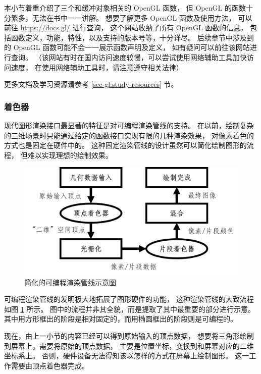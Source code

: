 \documentclass[fontset=windows]{ctexart}
\begin{document}
本小节着重介绍了三个和缓冲对象相关的 OpenGL 函数，
但 OpenGL 的函数十分繁多，无法在书中一一讲解。
想要了解更多 OpenGL 函数及使用方法，
可以前往 \href{https://docs.gl/}{https://docs.gl/} 进行查询，
这个网站收纳了所有 OpenGL 函数的信息，
包括函数定义，功能，特性，以及支持的版本号等，十分详尽。
后续章节中涉及到的 OpenGL 函数可能不会一一展示函数声明及定义，
如有疑问可以前往该网站进行查询。
（该网站有时在国内访问速度较慢，可以尝试使用网络辅助工具加快访问速度，
在使用网络辅助工具时，请注意遵守相关法律）

更多文档及学习资源请参考 \ref{sec-gl:study-resources} 节。

\subsubsection{着色器}

现代图形渲染接口最显著的特征是对可编程渲染管线的支持。
在以前，绘制复杂的三维场景时只能通过给定的函数接口实现有限的几种渲染效果，
对像素着色的方式也是固定在硬件中的。
这种固定渲染管线的设计虽然可以简化绘制图形的流程，
但难以实现理想的绘制效果。

\begin{figure}[htbp]
    \centering
    \includegraphics[width=0.8\linewidth]{imgs/sec 3.2/programmable-rendering-pipeline.png}
    \caption{简化的可编程渲染管线示意图}
    \label{fig-gl:programmable-rendering-pipeline}
\end{figure}

可编程渲染管线的发明极大地拓展了图形硬件的功能，
这种渲染管线的大致流程如图 \ref{fig-gl:programmable-rendering-pipeline} 所示。
图中的流程并非其全貌，而是提取了其中最重要的部分进行示意。
其中用方形框出的阶段是相对固定的，而用椭圆框出的阶段则是可编程的。

现在，由上一小节的内容已经可以得到原始输入的顶点数据，
想要将三角形绘制到屏幕上，需要将原始的顶点数据，
主要是位置坐标，变换到和屏幕对应的二维坐标系上。
否则，硬件设备无法得知该以怎样的方式在屏幕上绘制图形。
这一工作需要由顶点着色器完成。
\end{document}
